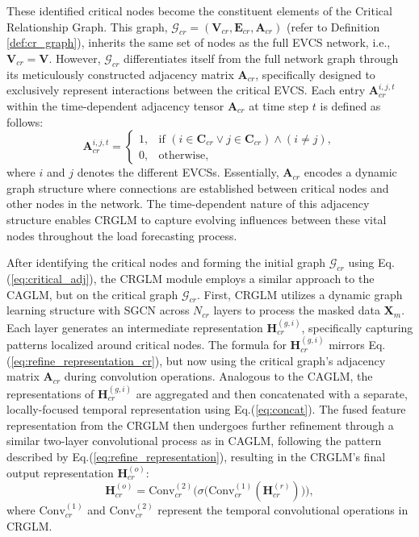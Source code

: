 \documentclass[lettersize,journal]{IEEEtran}
\begin{document}
These identified critical nodes become the constituent elements of the Critical Relationship Graph. This graph,  $\bm{\mathcal{G}}_{cr} = (\bm{V}_{cr}, \bm{E}_{cr}, \bm{A}_{cr})$ (refer to Definition  \ref{def:cr_graph}), inherits the same set of nodes as the full EVCS network, i.e.,  $\bm{V}_{cr} = \bm{V}$. However, $\bm{\mathcal{G}}_{cr}$   differentiates itself from the full network graph through its meticulously constructed adjacency matrix $\bm{A}_{cr}$, specifically designed to exclusively represent interactions between the critical EVCS. Each entry $\bm{A}_{cr}^{i,j, t}$ within the time-dependent adjacency tensor $\bm{A}_{cr}$   at time step $t$ is defined as follows:
\begin{equation}
    \bm{A}_{cr}^{i,j,t} = 
    \begin{cases}
        1, & \text{if } (i \in \bm{C}_{cr} \vee j \in \bm{C}_{cr}) \wedge (i \neq j), \\
        0, & \text{otherwise},
    \end{cases}
    \label{eq:critical_adj}
\end{equation}
where $i$ and $j$ denotes the different EVCSs.
Essentially, $\bm{A}_{cr}$ encodes a dynamic graph structure where connections are established between critical nodes and other nodes in the network. The time-dependent nature of this adjacency structure enables CRGLM to capture evolving influences between these vital nodes throughout the load forecasting process.   

After identifying the critical nodes and forming the initial graph $\bm{\mathcal{G}}_{cr}$ using Eq.(\ref{eq:critical_adj}),  the CRGLM module employs a similar approach to the CAGLM, but on the critical graph $\bm{\mathcal{G}}_{cr}$. First, CRGLM utilizes a dynamic graph learning structure with SGCN across $N_{cr}$ layers to process the masked data $\bm{X}_{m}$. Each layer generates an intermediate representation $\bm{H}^{(g, i)}_{cr}$, specifically capturing patterns localized around critical nodes. The formula for $\bm{H}^{(g, i)}_{cr}$ mirrors Eq.(\ref{eq:refine_representation_cr}), but now using the critical graph's adjacency matrix $\bm{A}_{cr}$ during convolution operations.
Analogous to the CAGLM, the representations of $\bm{H}^{(g, i)}_{cr}$ are aggregated and then concatenated with a separate, locally-focused temporal representation using Eq.(\ref{eq:concat}). The fused feature representation from the CRGLM then undergoes further refinement through a similar two-layer convolutional process as in CAGLM, following the pattern described by Eq.(\ref{eq:refine_representation}), resulting in the CRGLM’s final output representation $\bm{H}^{(o)}_{cr}$:
\begin{equation}
	\bm{H}^{(o)}_{cr} = \text{Conv}^{(2)}_{cr} \Big(\sigma \big( \text{Conv}^{(1)}_{cr} (\bm{H}^{(r)}_{cr} )  \big)\Big),
	\label{eq:refine_representation_cr}
\end{equation}
where $\text{Conv}^{(1)}_{cr}$ and $\text{Conv}^{(2)}_{cr}$ represent the temporal convolutional operations in CRGLM.
\end{document}
